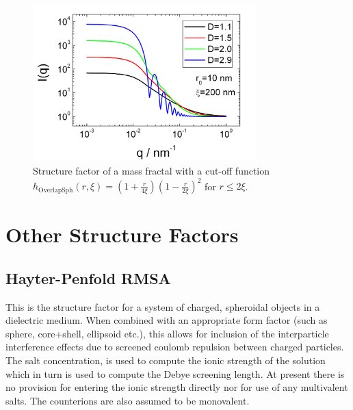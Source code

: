 \begin{figure}[htb]
\begin{center}
\includegraphics[width=0.768\textwidth,height=0.488\textwidth]{../images/structure_factor/MassFractals/SQOverlapSphCutOff.png}
\end{center}
\caption{Structure factor of a mass fractal with a
cut-off function $h_\text{OverlapSph}(r,\xi) = \left(1+\frac{r}{4\xi}\right)\left(1-\frac{r}{2\xi}\right)^2$ for $r\leq 2\xi$.}
\label{fig:SQOverlappSphCutOff}
\end{figure}

\clearpage
\section{Other Structure Factors}

\subsection{Hayter-Penfold RMSA \cite{Hayter1981,Hansen1982}}

This is the structure factor for a system of charged, spheroidal objects in a dielectric
medium. When
combined with an appropriate form factor (such as sphere, core+shell, ellipsoid etc.),
this allows for inclusion of the interparticle interference effects due to screened
coulomb repulsion between charged particles.
The salt concentration, is used to compute the ionic strength of the solution which
in turn is used to compute the Debye screening length. At present there is no provision
for entering the ionic strength directly nor for use of any multivalent salts. The
counterions are also assumed to be monovalent.



